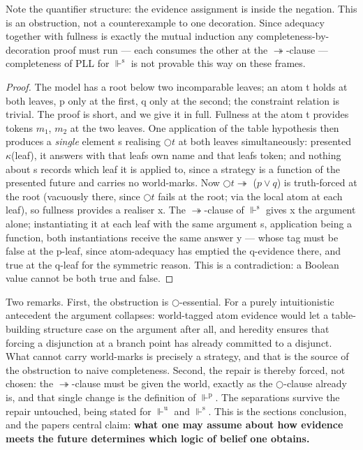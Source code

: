 Note the quantifier structure: the evidence assignment is inside the
negation. This is an obstruction, not a counterexample to one
decoration. Since adequacy together with fullness is exactly the mutual
induction any completeness-by-decoration proof must run --- each consumes
the other at the \ensuremath{\twoheadrightarrow}-clause --- completeness of PLL for \ensuremath{\Vdash^{\mathrm{s}}} is not provable
this way on these frames.

\begin{proof}
The model has a root below two incomparable leaves; an atom t holds at
both leaves, p only at the first, q only at the second; the constraint
relation is trivial. The proof is short, and we give it in full. Fullness
at the atom t provides tokens \ensuremath{m_{1}}, \ensuremath{m_{2}} at the two leaves. One
application of the table hypothesis then produces a \emph{single} element s
realising \ensuremath{\bigcirc t} at both leaves simultaneously: presented \ensuremath{\kappa}(leaf), it
answers with that leaf\textquotesingle s own name and that leaf\textquotesingle s token; and nothing
about s records which leaf it is applied to, since a strategy is a function
of the presented future and carries no world-marks. Now \ensuremath{\bigcirc t \twoheadrightarrow} (\ensuremath{p \vee q}) is
truth-forced at the root (vacuously there, since \ensuremath{\bigcirc t} fails at the root;
via the local atom at each leaf), so fullness provides a realiser x.
The \ensuremath{\twoheadrightarrow}-clause of \ensuremath{\Vdash^{\mathrm{s}}} gives x the argument alone; instantiating it at each
leaf with the same argument s, application being a function, both
instantiations receive the same answer y --- whose tag must be false at
the p-leaf, since atom-adequacy has emptied the q-evidence there, and
true at the q-leaf for the symmetric reason. This is a contradiction: a
Boolean value cannot be both true and false.
\end{proof}

Two remarks. First, the obstruction is \ensuremath{\bigcirc}-essential. For a purely
intuitionistic antecedent the argument collapses: world-tagged atom
evidence would let a table-building structure case on the argument
after all, and heredity ensures that forcing a disjunction at a branch
point has already committed to a disjunct. What cannot carry
world-marks is precisely a strategy, and that is the source of the
obstruction to naive completeness.
Second, the repair is thereby forced, not chosen: the \ensuremath{\twoheadrightarrow}-clause
must be given the world, exactly as the \ensuremath{\bigcirc}-clause already is, and that
single change is the definition of \ensuremath{\Vdash^{\mathrm{p}}}. The separations survive the
repair untouched, being stated for \ensuremath{\Vdash^{\mathrm{u}}} and \ensuremath{\Vdash^{\mathrm{s}}}. This is the section\textquotesingle s conclusion,
and the paper\textquotesingle s central claim: \textbf{what one may assume about how evidence
meets the future determines which logic of belief one obtains.}

